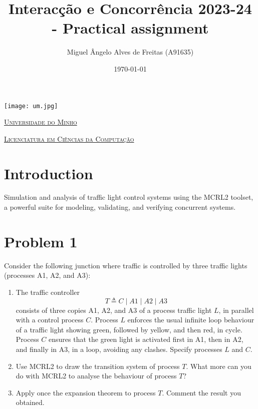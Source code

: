 \documentclass{article}
\title{Interacção e Concorrência 2023-24 - Practical assignment}
\author{Miguel Ângelo Alves de Freitas (A91635)}
\date{\today}
\begin{document}
\begin{minipage}{0.9\linewidth}
    \centering
    \texttt{[image: um.jpg]}\par\vspace{1cm}
    \href{https://www.uminho.pt/PT}
    {\scshape\LARGE Universidade do Minho} \par
    \vspace{0.6cm}
    \href{https://lcc.di.uminho.pt}
    {\scshape\Large Licenciatura em Ciências da Computação} \par
    \maketitle
\end{minipage}

\pagebreak

\begingroup
\renewcommand*\contentsname{Index}
\let\clearpage\relax
\tableofcontents
\endgroup

\newpage

\section{Introduction}

Simulation and analysis of traffic light control systems using the MCRL2 toolset, a powerful suite for modeling, validating, and verifying concurrent systems. 


\section{Problem 1}

Consider the following junction where traffic is controlled by three traffic lights (processes A1, A2, and A3):

\begin{enumerate}
    \item The traffic controller
    \[
    T \triangleq C \mid A1 \mid A2 \mid A3
    \]
    consists of three copies A1, A2, and A3 of a process traffic light $L$, in parallel with a control process $C$. Process $L$ enforces the usual infinite loop behaviour of a traffic light showing green, followed by yellow, and then red, in cycle. Process $C$ ensures that the green light is activated first in A1, then in A2, and finally in A3, in a loop, avoiding any clashes. Specify processes $L$ and $C$.

    \item Use MCRL2 to draw the transition system of process $T$. What more can you do with MCRL2 to analyse the behaviour of process $T$?

    \item Apply once the expansion theorem to process $T$. Comment the result you obtained.
\end{enumerate}
\end{document}
